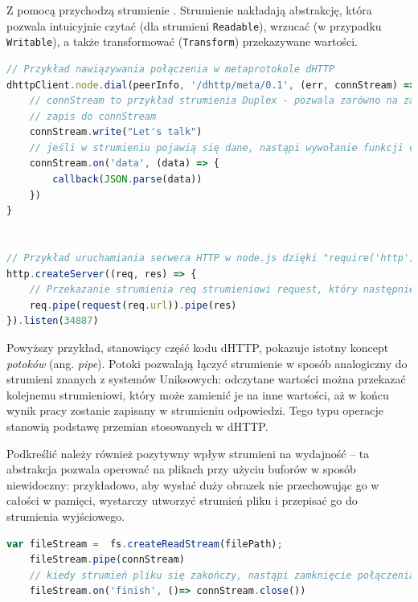 Z pomocą przychodzą strumienie \cite{nodeStreamAPI}. Strumienie nakładają abstrakcję, która pozwala intuicyjnie czytać (dla strumieni \texttt{Readable}), wrzucać (w przypadku \texttt{Writable}), a także transformować (\texttt{Transform}) przekazywane wartości.

\begin{lstlisting}[language=javascript]
// Przykład nawiązywania połączenia w metaprotokole dHTTP
dhttpClient.node.dial(peerInfo, '/dhttp/meta/0.1', (err, connStream) => {
    // connStream to przykład strumienia Duplex - pozwala zarówno na zapis, jak i odczyt.
    // zapis do connStream
    connStream.write("Let's talk")
    // jeśli w strumieniu pojawią się dane, nastąpi wywołanie funkcji callback. Warto zauważyć, że to wywołanie może nastąpić zarówno przed, jak i po zawołaniu write -- zależy od stanu strumienia, który może otrzymywać dane w innych miejscach programu
    connStream.on('data', (data) => {
        callback(JSON.parse(data))
    })
}


// Przykład uruchamiania serwera HTTP w node.js dzięki "require('http')"
http.createServer((req, res) => {
    // Przekazanie strumienia req strumieniowi request, który następnie zostanie przekazany do res. W efekcie zadziałamy jako najprostsze proxy - otrzymamy dane o oryginalnym zapytaniu, wywołamy je z punktu widzenia serwera, i przekażemy wynik w ramach odpowiedzi.
    req.pipe(request(req.url)).pipe(res)
}).listen(34887)
\end{lstlisting}

Powyższy przykład, stanowiący część kodu dHTTP, pokazuje istotny koncept {\em potoków} (ang. {\em pipe}). Potoki pozwalają łączyć strumienie w sposób analogiczny do strumieni znanych z systemów Uniksowych: odczytane wartości można przekazać kolejnemu strumieniowi, który może zamienić je na inne wartości, aż w końcu wynik pracy zostanie zapisany w strumieniu odpowiedzi. Tego typu operacje stanowią podstawę przemian stosowanych w dHTTP.

Podkreślić należy również pozytywny wpływ strumieni na wydajność -- ta abstrakcja pozwala operować na plikach przy użyciu buforów w sposób niewidoczny: przykładowo, aby wysłać duży obrazek nie przechowując go w całości w pamięci, wystarczy utworzyć strumień pliku i przepisać go do strumienia wyjściowego.

\pagebreak
\begin{lstlisting}[language=javascript]
    var fileStream =  fs.createReadStream(filePath);
    fileStream.pipe(connStream)
    // kiedy strumień pliku się zakończy, nastąpi zamknięcie połączenia aby poinformować odbiorcę, że nic już na niego nie czeka
    fileStream.on('finish', ()=> connStream.close())
\end{lstlisting}


